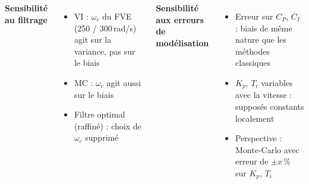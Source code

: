 \begin{frame}
    \vspace{1mm}
    {\small
    \begin{columns}[t]
        \textbf{Sensibilité au filtrage}
        \begin{itemize}
            \item VI : $\omega_c$ du FVE (250 / 300\,rad/s) agit sur la \alert{variance}, pas sur le biais
            \item MC : $\omega_c$ agit aussi sur le \alert{biais}
            \item Filtre optimal (raffiné) : choix de $\omega_c$ supprimé
        \end{itemize}
        \textbf{Sensibilité aux erreurs de modélisation}
        \begin{itemize}
            \item Erreur sur $C_P$, $C_I$ : biais de même nature que les méthodes classiques
            \item $K_p$, $T_i$ variables avec la vitesse : supposés constants localement
            \item Perspective : Monte-Carlo avec erreur de $\pm x\,\%$ sur $K_p$, $T_i$
        \end{itemize}
    \end{columns}}
\end{frame}

